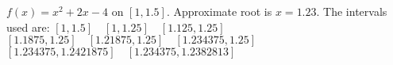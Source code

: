 {$f(x) = x^2+2x-4$ on $[1,1.5]$.
}
{Approximate root is $x=1.23$. The intervals used are:
$[1,1.5] \quad [1,1.25] \quad [1.125,1.25]$
$[1.1875,1.25]\quad [1.21875,1.25]\quad [1.234375,1.25]$
$[1.234375,1.2421875]\quad [1.234375,1.2382813]$
}
